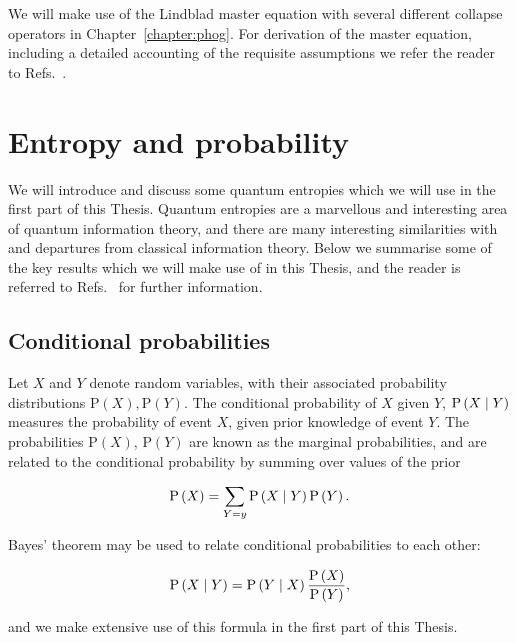 We will make use of the Lindblad master equation with several different collapse operators in Chapter~\ref{chapter:phog}. For derivation of the master equation, including a detailed accounting of the requisite assumptions we refer the reader to Refs.~\cite{Breuer2002, Carmichael1999}.



\FloatBarrier
\section{Entropy and probability}
We will introduce and discuss some quantum entropies which we will use in the first part of this Thesis. Quantum entropies are a marvellous and interesting area of quantum information theory, and there are many interesting similarities with and departures from classical information theory. Below we summarise some of the key results which we will make use of in this Thesis, and the reader is referred to Refs.~\cite{Nielsen2010, Tomamichel2016, Wilde2015, Watrous2019} for further information.



\FloatBarrier
\subsection{Conditional probabilities}
Let $X$ and $Y$ denote random variables, with their associated probability distributions $\text{P}\left(X\right), \text{P}\left(Y\right)$. The conditional probability of $X$ given $Y$, $\text{P}\left(X \; \middle| \; Y\right)$ measures the probability of event $X$, given prior knowledge of event $Y$. The probabilities $\text{P}\left(X\right)$, $\text{P}\left(Y\right)$ are known as the marginal probabilities, and are related to the conditional probability by summing over values of the prior 

\begin{equation}
\text{P}\left(X\right) = \sum_{Y=y} \text{P}\left(X \; \middle| \; Y\right) \text{P}\left(Y\right).
\end{equation}

Bayes' theorem may be used to relate conditional probabilities to each other:

\begin{equation}\label{eqn:intro_bayes}
\text{P}\left(X \; \middle| \; Y\right) = \text{P}\left(Y \; \middle| \; X\right) \frac{\text{P}\left(X\right)}{\text{P}\left(Y\right)},
\end{equation}

\noindent and we make extensive use of this formula in the first part of this Thesis.

